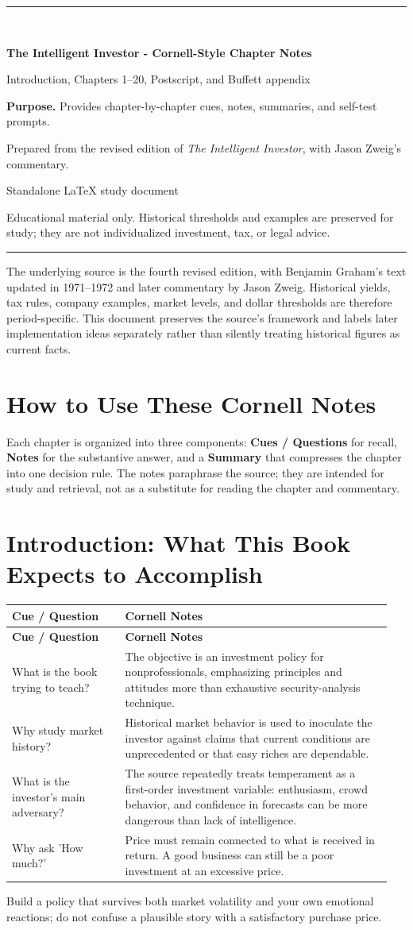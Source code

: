 \documentclass[11pt]{article}
\newcommand{\makedoccover}[4]{%
\hypersetup{pageanchor=false}%
\begin{titlepage}
\thispagestyle{empty}
\vspace*{1.0in}
{\color{Navy}\rule{\linewidth}{2.2pt}}\\[0.55in]
{\Huge\bfseries\color{Navy} #1\par}
\vspace{0.18in}
{\Large\color{Teal} #2\par}
\vspace{0.5in}
\begin{tcolorbox}[colback=LightGray,colframe=Gray,boxrule=0.5pt,arc=2mm]
\textbf{Purpose.} #3
\end{tcolorbox}
\vfill
{\large Prepared from the revised edition of \textit{The Intelligent Investor}, with Jason Zweig's commentary.\par}
\vspace{0.12in}
{\small #4\par}
\vspace{0.25in}
{\small\color{Gray}\parbox{0.90\textwidth}{\centering Educational material only. Historical thresholds and examples are preserved for study; they are not individualized investment, tax, or legal advice.}}\par
\vspace{0.35in}
{\color{Navy}\rule{\linewidth}{2.2pt}}
\end{titlepage}\hypersetup{pageanchor=true}
}
\begin{document}
\makedoccover{The Intelligent Investor - Cornell-Style Chapter Notes}{Introduction, Chapters 1--20, Postscript, and Buffett appendix}{Provides chapter-by-chapter cues, notes, summaries, and self-test prompts.}{Standalone LaTeX study document}
\tableofcontents\newpage

\begin{cautionbox}
The underlying source is the fourth revised edition, with Benjamin Graham's text updated in 1971--1972 and later commentary by Jason Zweig. Historical yields, tax rules, company examples, market levels, and dollar thresholds are therefore period-specific. This document preserves the source's framework and labels later implementation ideas separately rather than silently treating historical figures as current facts.
\end{cautionbox}

\section{How to Use These Cornell Notes}
Each chapter is organized into three components: \textbf{Cues / Questions} for recall, \textbf{Notes} for the substantive answer, and a \textbf{Summary} that compresses the chapter into one decision rule. The notes paraphrase the source; they are intended for study and retrieval, not as a substitute for reading the chapter and commentary.

\section{Introduction: What This Book Expects to Accomplish}
\begin{longtable}{@{}>{\raggedright\arraybackslash}p{0.29\linewidth}>{\raggedright\arraybackslash}p{0.66\linewidth}@{}}\toprule\textbf{Cue / Question} & \textbf{Cornell Notes}\\\midrule\endfirsthead\toprule\textbf{Cue / Question} & \textbf{Cornell Notes}\\\midrule\endhead
What is the book trying to teach? & The objective is an investment policy for nonprofessionals, emphasizing principles and attitudes more than exhaustive security-analysis technique. \\
Why study market history? & Historical market behavior is used to inoculate the investor against claims that current conditions are unprecedented or that easy riches are dependable. \\
What is the investor's main adversary? & The source repeatedly treats temperament as a first-order investment variable: enthusiasm, crowd behavior, and confidence in forecasts can be more dangerous than lack of intelligence. \\
Why ask 'How much?' & Price must remain connected to what is received in return. A good business can still be a poor investment at an excessive price. \\
\bottomrule\end{longtable}
\begin{principlebox}Build a policy that survives both market volatility and your own emotional reactions; do not confuse a plausible story with a satisfactory purchase price.\end{principlebox}
\end{document}
